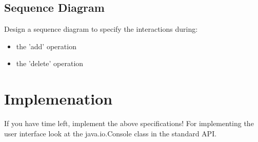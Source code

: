 \documentclass{exercices}
\renewcommand{\|}{\url|}
\begin{document}
\subsection{Sequence Diagram}
\begin{exercice}
  Design a sequence diagram to specify the interactions during:
  \begin{itemize}
  \item the 'add' operation
  \item the 'delete' operation
  \end{itemize}
\end{exercice}

\section{Implemenation}
\begin{exercice}
If you have time left, implement the above specifications!
For implementing the user interface look at the java.io.Console class in the standard API.
\end{exercice}
\end{document}
